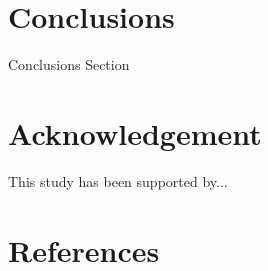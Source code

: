 \documentclass[review, 1p, number, sort&compress,table]{elsarticle}
\begin{document}
	      

	\section{Conclusions}
	\indent Conclusions Section

	\section{Acknowledgement}
	\indent This study has been supported by...      			
	
\section{References}
		
\end{document}
